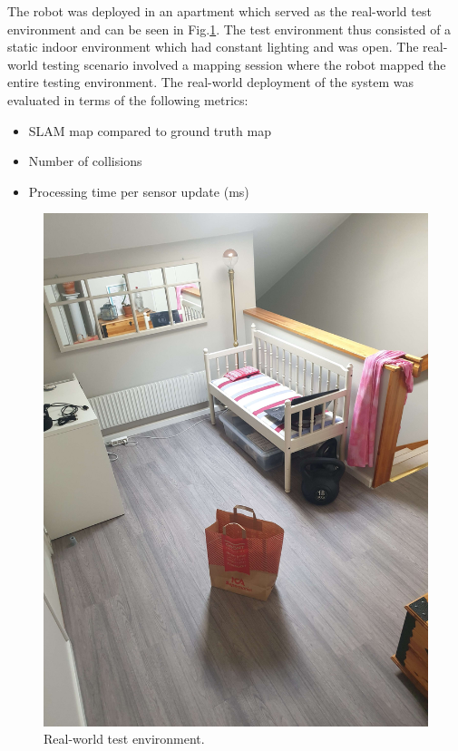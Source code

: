 The robot was deployed in an apartment which served as the real-world test environment and can be seen in Fig.\:\ref{fig:real_world_map}. The test environment thus consisted of a static indoor environment which had constant lighting and was open. 
The real-world testing scenario involved a mapping session where the robot mapped the entire testing environment.
The real-world deployment of the system was evaluated in terms of the following metrics:
\begin{itemize}
    \item SLAM map compared to ground truth map
    \item Number of collisions
    \item Processing time per sensor update (ms)
\end{itemize}

\begin{figure}
    \centering
    \includegraphics[width=\columnwidth]{images/real_world_map.jpg}
    \caption{Real-world test environment.}
    \label{fig:real_world_map}
\end{figure}

